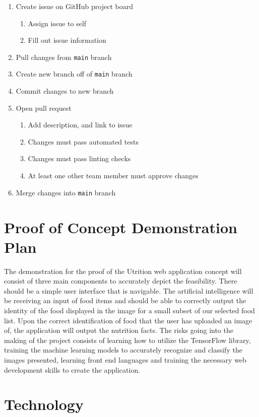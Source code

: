 \documentclass{article}
\begin{document}
\begin{enumerate}
	\item Create issue on GitHub project board
	\begin{enumerate}
		\item Assign issue to self
		\item Fill out issue information
	\end{enumerate}
	\item Pull changes from \texttt{main} branch
	\item Create new branch off of \texttt{main} branch
	\item Commit changes to new branch
	\item Open pull request
	\begin{enumerate}
		\item Add description, and link to issue
		\item Changes must pass automated tests
		\item Changes must pass linting checks
		\item At least one other team member must approve changes
	\end{enumerate}
	\item Merge changes into \texttt{main} branch
	
\end{enumerate}
\section{Proof of Concept Demonstration Plan}

The demonstration for the proof of the Utrition web application concept will consist of three main components to accurately depict the feasibility. There should be a simple user interface that is navigable. The artificial intelligence will be receiving an input of food items and should be able to correctly output the identity of the food displayed in the image for a small subset of our selected food list. Upon the correct identification of food that the user has uploaded an image of, the application will output the nutrition facts. The risks going into the making of the project consists of learning how to utilize the TensorFlow library, training the machine learning models to accurately recognize and classify the images presented, learning front end languages and training the necessary web development skills to create the application.

\section{Technology}
\end{document}
